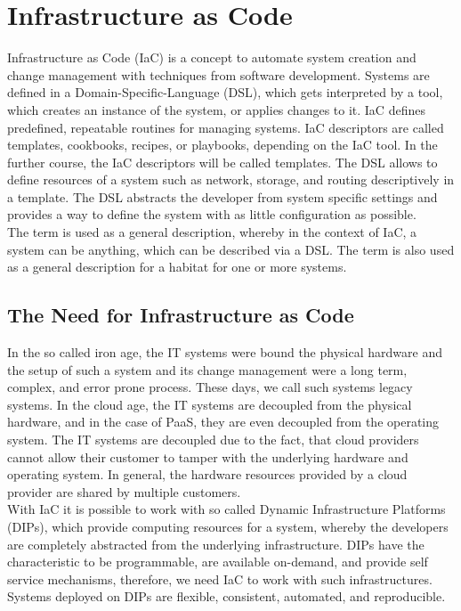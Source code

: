 \chapter{Infrastructure as Code}
\label{cha:iac}
Infrastructure as Code (IaC) is a concept to automate system creation and change management with techniques from software development. Systems are defined in a Domain-Specific-Language (DSL), which gets interpreted by a tool, which creates an instance of the system, or applies changes to it. IaC defines predefined, repeatable routines for managing systems. IaC descriptors are called templates, cookbooks, recipes, or playbooks, depending on the IaC tool. In the further course, the IaC descriptors will be called templates. The DSL allows to define resources of a system such as network, storage, and routing descriptively in a template. The DSL abstracts the developer from system specific settings and provides a way to define the system with as little configuration as possible\cite{Morris2016}. \\

The term  is used as a general description, whereby in the context of IaC, a system can be anything, which can be described via a DSL. The term  is also used as a general description for a habitat for one or more systems.  

\section{The Need for Infrastructure as Code}
\label{sec:iac-need}
In the so called iron age, the IT systems were bound the physical hardware and the setup of such a system and its change management were a long term, complex, and error prone process. These days, we call such systems legacy systems. In the cloud age, the IT systems are decoupled from the physical hardware, and in the case of PaaS, they are even decoupled from the operating system. The IT systems are decoupled due to the fact, that cloud providers cannot allow their customer to tamper with the underlying hardware and operating system. In general, the hardware resources provided by a cloud provider are shared by multiple customers\cite{Morris2016}. \\

With IaC it is possible to work with so called Dynamic Infrastructure Platforms (DIPs), which provide computing resources for a system, whereby the developers are completely abstracted from the underlying infrastructure. DIPs have the characteristic to be programmable, are available on-demand, and provide self service mechanisms, therefore, we need IaC to work with such infrastructures. Systems deployed on DIPs are flexible, consistent, automated, and reproducible\cite{Morris2016}. \\

